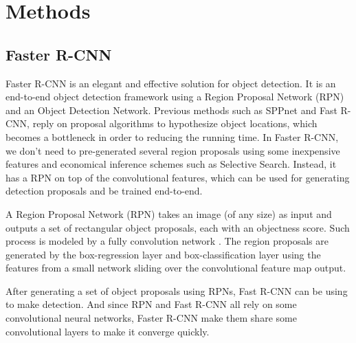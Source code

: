 \section{Methods}



\subsection{Faster R-CNN}
Faster R-CNN is an elegant and effective solution for object detection. 
It is an end-to-end object detection framework using a Region Proposal Network (RPN) and an Object Detection Network. Previous methods such as SPPnet and Fast R-CNN, reply on proposal algorithms to hypothesize object locations, which becomes a bottleneck in order to reducing the running time. In Faster R-CNN, we don't need to pre-generated several region proposals using some inexpensive features and economical inference schemes such as Selective Search. Instead, it has a RPN on top of the convolutional features, which can be used for generating detection proposals and be trained end-to-end. 

A Region Proposal Network (RPN) takes an image (of any size) as input and outputs a set of rectangular object proposals, each with an objectness score. Such process is modeled by a fully convolution network \cite{long2015fully}. The region proposals are generated by 
the box-regression layer and box-classification layer using the features from a small network sliding over the convolutional feature map output. 

After generating a set of object proposals using RPNs, Fast R-CNN can be using to make detection. And since RPN and Fast R-CNN all rely on some convolutional neural networks, Faster R-CNN make them share some convolutional layers to make it converge quickly.
